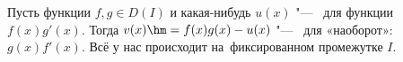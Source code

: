 
  Пусть функции $f,g\in D(I)$ и какая-нибудь $u(x)$ "--- \tp\ для функции $f(x)g'(x)$. Тогда $v(x)\hm=f(x)g(x)-u(x)$ "--- \tp\ для «наоборот»: $g(x)f'(x)$.
  Всё у нас происходит на~фиксированном промежутке $I$.

